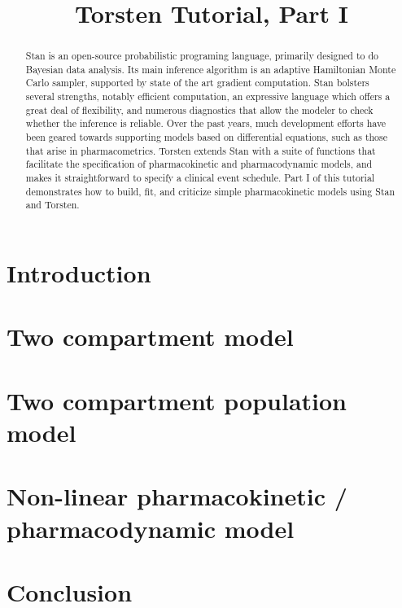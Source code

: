 \documentclass[11pt]{article}
\title{Torsten Tutorial, Part I}
\author{}
\date{}
\begin{document}
\maketitle

\begin{abstract}
  Stan is an open-source probabilistic programing language, primarily designed to do Bayesian data analysis.
  Its main inference algorithm is an adaptive Hamiltonian Monte Carlo sampler, supported by state of the art gradient computation.
  Stan bolsters several strengths, notably efficient computation, an expressive language which offers a great deal of flexibility, and numerous diagnostics that allow the modeler to check whether the inference is reliable.
  Over the past years, much development efforts have been geared towards supporting models based on differential equations, such as those that arise in pharmacometrics.
  Torsten extends Stan with a suite of functions that facilitate the specification of pharmacokinetic and pharmacodynamic models, and makes it straightforward to specify a clinical event schedule.
  Part I of this tutorial demonstrates how to build, fit, and criticize simple pharmacokinetic models using Stan and Torsten.
\end{abstract}

\section{Introduction}


\section{Two compartment model}


\section{Two compartment population model}


\section{Non-linear pharmacokinetic / pharmacodynamic model}


\section{Conclusion}




\end{document}
